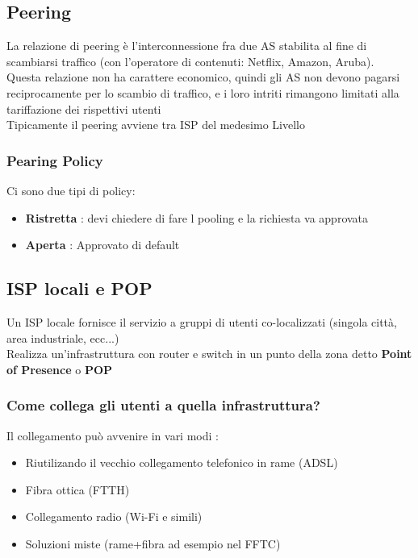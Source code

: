 \documentclass{report}
\begin{document}
                \subsection{Peering}
                    La relazione di peering è l'interconnessione fra due AS stabilita al fine di scambiarsi traffico (con l'operatore di contenuti: Netflix, Amazon, Aruba).
                    \\
                    Questa relazione non ha carattere economico, quindi gli AS non devono pagarsi reciprocamente per lo scambio di traffico, e i loro intriti rimangono limitati alla tariffazione dei rispettivi utenti
                    \\
                    Tipicamente il peering avviene tra ISP del medesimo Livello
                    \subsubsection{Pearing Policy}
                        Ci sono due tipi di policy: 
                        \begin{itemize}
                            \item \textbf{Ristretta} : devi chiedere di fare l pooling e la richiesta va approvata
                            \item \textbf{Aperta} : Approvato di default
                        \end{itemize}
                \subsection{ISP locali e POP}   
                    Un ISP locale fornisce il servizio a gruppi di utenti co-localizzati (singola città, area industriale, ecc...)
                    \\
                    Realizza un'infrastruttura con router e switch in un punto della zona detto \textbf{Point of Presence} o \textbf{POP}
                    \subsubsection{Come collega gli utenti a quella infrastruttura?}
                        Il collegamento può avvenire in vari modi :
                        \begin{itemize}
                            \item Riutilizando il vecchio collegamento telefonico in rame (ADSL)
                            \item Fibra ottica (FTTH)
                            \item Collegamento radio (Wi-Fi e simili)
                            \item Soluzioni miste (rame+fibra ad esempio nel FFTC)
                        \end{itemize}
\end{document}
